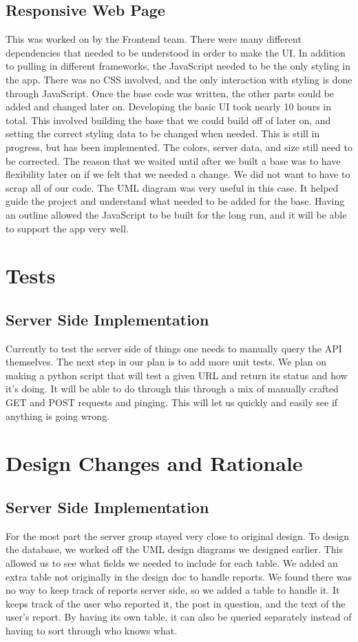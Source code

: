 \documentclass[12pt]{article}
\begin{document}
      \subsection{Responsive Web Page}
      This was worked on by the Frontend team. There were many different dependencies that needed to be understood in order to make the UI. In addition to pulling in different frameworks, the JavaScript needed to be the only styling in the app. There was no CSS involved, and the only interaction with styling is done through JavaScript. Once the base code was written, the other parts could be added and changed later on. Developing the basic UI took nearly 10 hours in total. This involved building the base that we could build off of later on, and setting the correct styling data to be changed when needed. This is still in progress, but has been implemented. The colors, server data, and size still need to be corrected. The reason that we waited until after we built a base was to have flexibility later on if we felt that we needed a change. We did not want to have to scrap all of our code. The UML diagram was very useful in this case. It helped guide the project and understand what needed to be added for the base. Having an outline allowed the JavaScript to be built for the long run, and it will be able to support the app very well.
\section{Tests}
\subsection{Server Side Implementation}
Currently to test the server side of things one needs to manually query the API themselves.  The next step in our plan is to add more unit tests.  We plan on making a python script that will test a given URL and return its status and how it's doing.  It will be able to do through this through a mix of manually crafted GET and POST requests and pinging.  This will let us quickly and easily see if anything is going wrong.
\section{Design Changes and Rationale}
\subsection{Server Side Implementation}
For the most part the server group stayed very close to original design.  To design the database, we worked off the UML design diagrams we designed earlier.  This allowed us to see what fields we needed to include for each table.  We added an extra table not originally in the design doc to handle reports.  We found there was no way to keep track of reports server side, so we added a table to handle it.  It keeps track of the user who reported it, the post in question, and the text of the user’s report.  By having its own table, it can also be queried separately instead of having to sort through who knows what.
\end{document}

